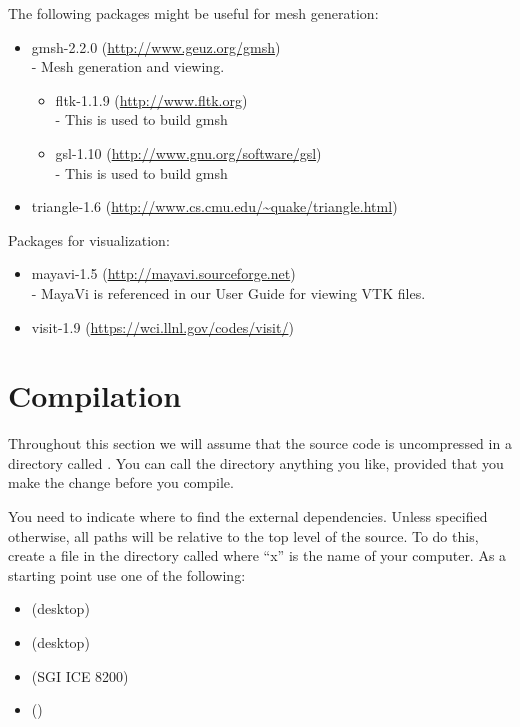 The following packages might be useful for mesh generation:
\begin{itemize}
 \item gmsh-2.2.0 (\url{http://www.geuz.org/gmsh}) \\-
    Mesh generation and viewing.
  \begin{itemize}
 \item fltk-1.1.9 (\url{http://www.fltk.org}) \\-
    This is used to build gmsh 
\item gsl-1.10 (\url{http://www.gnu.org/software/gsl}) \\-
    This is used to build gmsh 
\end{itemize}

\item triangle-1.6 (\url{http://www.cs.cmu.edu/~quake/triangle.html}) 
\end{itemize}

Packages for visualization:
\begin{itemize}
 \item mayavi-1.5 (\url{http://mayavi.sourceforge.net}) \\-
    MayaVi is referenced in our User Guide for viewing VTK files.
 \item visit-1.9 (\url{https://wci.llnl.gov/codes/visit/})
\end{itemize}

\section{Compilation}\label{sec:compilesrc}
Throughout this section we will assume that the source code is uncompressed in a directory called .
You can call the directory anything you like, provided that you make the change before you compile.

You need to indicate where to find the external dependencies.
Unless specified otherwise, all paths will be relative to the top level of the source.
To do this, create a file in the  directory called  where ``x'' is the name of your computer.
As a starting point use one of the following:
\begin{itemize}
 \item {} (\linux desktop)
\item {} (\macosx desktop)
\item {} (SGI ICE 8200)
\item {} (\winxp)
\end{itemize}

